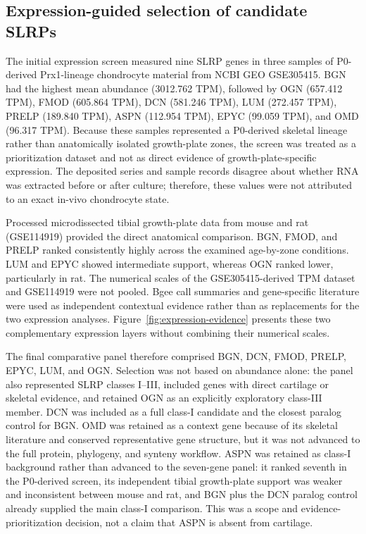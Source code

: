 
\subsection{Expression-guided selection of candidate SLRPs}
\label{subsec:results-expression}

The initial expression screen measured nine SLRP genes in three samples of
P0-derived Prx1-lineage chondrocyte material from NCBI GEO GSE305415. BGN had the
highest mean abundance (3012.762 TPM), followed by OGN (657.412 TPM), FMOD
(605.864 TPM), DCN (581.246 TPM), LUM (272.457 TPM), PRELP (189.840 TPM),
ASPN (112.954 TPM),
EPYC (99.059 TPM), and OMD (96.317 TPM). Because these samples represented a
P0-derived skeletal lineage rather than anatomically isolated growth-plate zones,
the screen was treated as a prioritization dataset and not as direct evidence
of growth-plate-specific expression. The deposited series and sample records
disagree about whether RNA was extracted before or after culture; therefore,
these values were not attributed to an exact in-vivo chondrocyte state.

Processed microdissected tibial growth-plate data from mouse and rat
(GSE114919) provided the direct anatomical comparison. BGN, FMOD, and PRELP
ranked consistently highly across the examined age-by-zone conditions. LUM and
EPYC showed intermediate support, whereas OGN ranked lower, particularly in
rat. The numerical scales of the GSE305415-derived TPM dataset and GSE114919
were not pooled. Bgee call summaries and gene-specific literature were used as
independent contextual evidence rather than as replacements for the two
expression analyses. Figure~\ref{fig:expression-evidence} presents these two
complementary expression layers without combining their numerical scales.

The final comparative panel therefore comprised BGN, DCN, FMOD, PRELP, EPYC,
LUM, and OGN. Selection was not based on abundance alone: the panel also represented
SLRP classes I--III, included genes with direct cartilage or skeletal evidence,
and retained OGN as an explicitly exploratory class-III member. DCN was included
as a full class-I candidate and the closest paralog control for BGN. OMD was
retained as a context gene because of its
skeletal literature and conserved representative gene structure, but it was not
advanced to the full protein, phylogeny, and synteny workflow. ASPN was retained
as class-I background rather than advanced to the seven-gene panel: it ranked
seventh in the P0-derived screen, its independent tibial growth-plate support
was weaker and inconsistent between mouse and rat, and BGN plus the DCN paralog
control already supplied the main class-I comparison. This was a scope and
evidence-prioritization decision, not a claim that ASPN is absent from cartilage.

